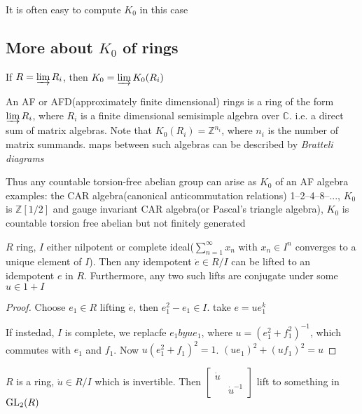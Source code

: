 \documentclass[main]{subfiles}
\begin{document}
It is often easy to compute $K_0$ in this case

\subsection{More about $K_0$ of rings}

If $R=\varinjlim R_i$, then $K_0=\varinjlim K_0(R_i)$

\begin{example}
An AF or AFD(approximately finite dimensional) rings is a ring of the form $\varinjlim R_i$, where $R_i$ is a finite dimensional semisimple algebra over $\mathbb C$. i.e. a direct sum of matrix algebras. Note that $K_0(R_i)=\mathbb Z^{n_i}$, where $n_i$ is the number of matrix summands. maps between such algebras can be described by \textit{Bratteli diagrams}
\begin{center}

\end{center}
Thus any countable torsion-free abelian group can arise as $K_0$ of an AF algebra examples: the CAR algebra(canonical anticommutation relations) 1--2--4--8--..., $K_0$ is $\mathbb Z[1/2]$ and gauge invariant CAR algebra(or Pascal's triangle algebra), $K_0$ is countable torsion free abelian but not finitely generated
\end{example}

\begin{lemma}\label{Lemma for idempotent lifting}
$R$ ring, $I$ either nilpotent or complete ideal($\sum_{n=1}^\infty x_n$ with $x_n\in I^n$ converges to a unique element of $I$). Then any idempotent $\dot e\in R/I$ can be lifted to an idempotent $e$ in $R$. Furthermore, any two such lifts are conjugate under some $u\in 1+I$
\end{lemma}

\begin{proof}
Choose $e_1\in R$ lifting $\dot e$, then $e_1^2-e_1\in I$. take $e=ue_1^k$

If instedad, $I$ is complete, we replacfe $e_1 by ue_1$, where $u=(e_1^2+f_1^2)^{-1}$, which commutes with $e_1$ and $f_1$. Now $u(e_1^2+f_1)^2=1$. $(ue_1)^2+(uf_1)^2=u$
\end{proof}

\begin{lemma}
$R$ is a ring, $\dot u\in R/I$ which is invertible. Then
$
\begin{bmatrix}
\dot u\\
&\dot u^{-1}
\end{bmatrix}
$ lift to something in $\operatorname{GL}_2(R)$
\end{lemma}
\end{document}
